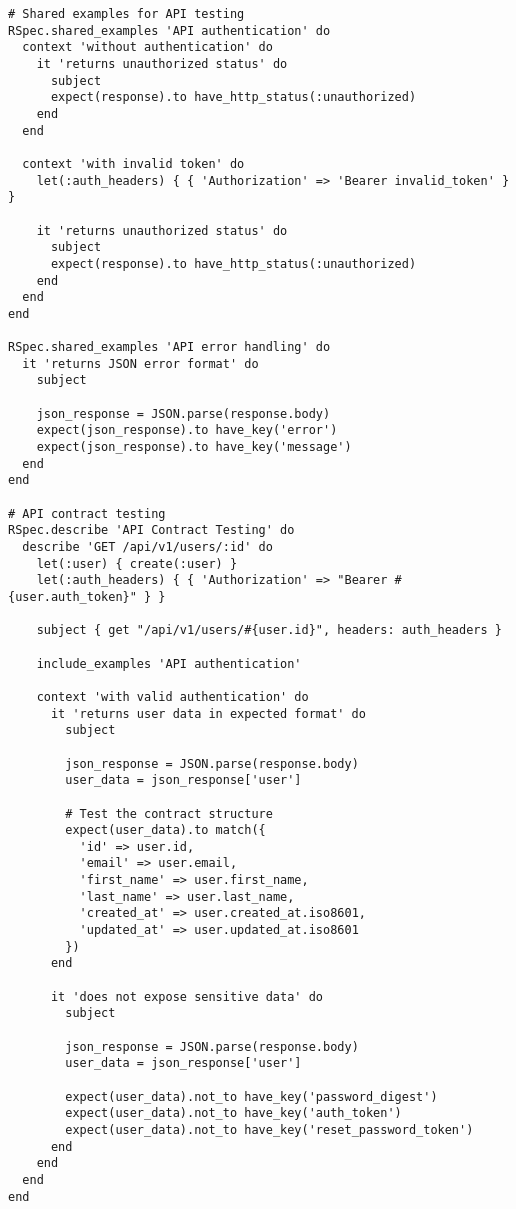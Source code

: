 \documentclass[12pt,a4paper]{article}
\begin{document}
\begin{lstlisting}
# Shared examples for API testing
RSpec.shared_examples 'API authentication' do
  context 'without authentication' do
    it 'returns unauthorized status' do
      subject
      expect(response).to have_http_status(:unauthorized)
    end
  end

  context 'with invalid token' do
    let(:auth_headers) { { 'Authorization' => 'Bearer invalid_token' } }
    
    it 'returns unauthorized status' do
      subject
      expect(response).to have_http_status(:unauthorized)
    end
  end
end

RSpec.shared_examples 'API error handling' do
  it 'returns JSON error format' do
    subject
    
    json_response = JSON.parse(response.body)
    expect(json_response).to have_key('error')
    expect(json_response).to have_key('message')
  end
end

# API contract testing
RSpec.describe 'API Contract Testing' do
  describe 'GET /api/v1/users/:id' do
    let(:user) { create(:user) }
    let(:auth_headers) { { 'Authorization' => "Bearer #{user.auth_token}" } }
    
    subject { get "/api/v1/users/#{user.id}", headers: auth_headers }

    include_examples 'API authentication'

    context 'with valid authentication' do
      it 'returns user data in expected format' do
        subject
        
        json_response = JSON.parse(response.body)
        user_data = json_response['user']
        
        # Test the contract structure
        expect(user_data).to match({
          'id' => user.id,
          'email' => user.email,
          'first_name' => user.first_name,
          'last_name' => user.last_name,
          'created_at' => user.created_at.iso8601,
          'updated_at' => user.updated_at.iso8601
        })
      end

      it 'does not expose sensitive data' do
        subject
        
        json_response = JSON.parse(response.body)
        user_data = json_response['user']
        
        expect(user_data).not_to have_key('password_digest')
        expect(user_data).not_to have_key('auth_token')
        expect(user_data).not_to have_key('reset_password_token')
      end
    end
  end
end
\end{lstlisting}
\end{document}
